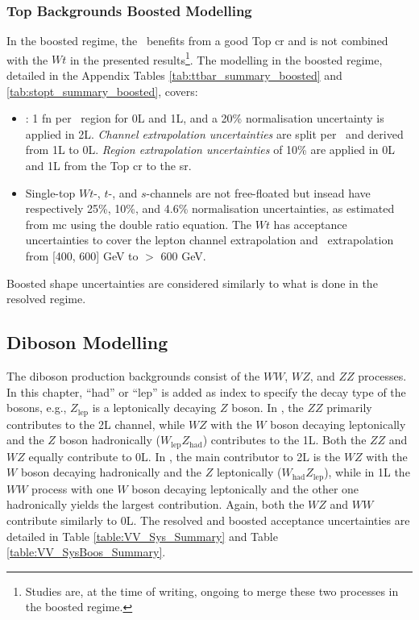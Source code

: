 \subsubsection{Top Backgrounds Boosted Modelling} 
In the boosted regime, the \ttb\ benefits from a good Top \gls{cr} and is not combined with the $Wt$ in the presented results\footnote{Studies are, at the time of writing, ongoing to merge these two processes in the boosted regime.}. The modelling in the boosted regime, detailed in the Appendix Tables \ref{tab:ttbar_summary_boosted} and \ref{tab:stopt_summary_boosted}, covers:
\begin{itemize}[leftmargin=*]
    \item \ttb: 1 \gls{fn} per \ptv\ region for 0L and 1L, and a 20\% normalisation uncertainty is applied in 2L. \textit{Channel extrapolation uncertainties} are split per \ptv\ and derived from 1L to 0L. \textit{Region extrapolation uncertainties} of 10\% are applied in 0L and 1L from the Top \gls{cr} to the \gls{sr}.
    \item Single-top $Wt$-, $t$-, and $s$-channels are not free-floated but insead have respectively 25\%, 10\%, and 4.6\% normalisation uncertainties, as estimated from \gls{mc} using the double ratio equation. The $Wt$ has acceptance uncertainties to cover the lepton channel extrapolation and \ptv\ extrapolation from [400, 600] GeV to $>$ 600 GeV. 
\end{itemize}
Boosted shape uncertainties are considered similarly to what is done in the resolved regime.

\subsection{Diboson Modelling}
The diboson production backgrounds consist of the $WW$, $WZ$, and $ZZ$ processes. In this chapter, ``had'' or ``lep'' is added as index to specify the decay type of the bosons, e.g., $Z_{\text{lep}}$ is a leptonically decaying $Z$ boson. In \vhb, the $ZZ$ primarily contributes to the 2L channel, while $WZ$ with the $W$ boson decaying leptonically and the $Z$ boson hadronically ($W_{\text{lep}}Z_{\text{had}}$) contributes to the 1L. Both the $ZZ$ and $WZ$ equally contribute to 0L. In \vhc, the main contributor to 2L is the $WZ$ with the $W$ boson decaying hadronically and the $Z$ leptonically ($W_{\text{had}}Z_{\text{lep}}$), while in 1L the $WW$ process with one $W$ boson decaying leptonically and the other one hadronically yields the largest contribution. Again, both the $WZ$ and $WW$ contribute similarly to 0L. The resolved and boosted acceptance uncertainties are detailed in Table \ref{table:VV_Sys_Summary} and Table \ref{table:VV_SysBoos_Summary}. \\

